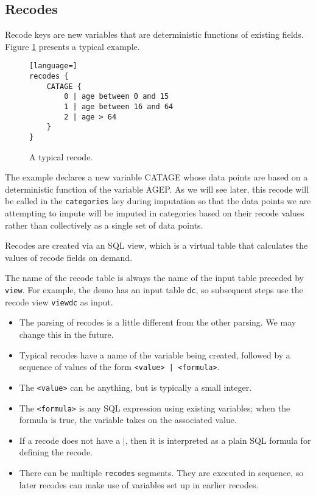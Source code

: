 \documentclass{article}
\begin{document}
\subsection{Recodes}
Recode keys are new variables that are deterministic functions of 
existing fields. Figure \ref{basicrecode} presents a typical example.

\begin{figure}
\begin{lstlisting}[language=]
recodes {
    CATAGE {
        0 | age between 0 and 15
        1 | age between 16 and 64
        2 | age > 64
    }
}
\end{lstlisting}
\caption{A typical recode.}\label{basicrecode}
\end{figure}

The example declares a new variable CATAGE whose data points are based on a
deterministic function of the variable AGEP. As we will see later, this recode will
be called in the {\tt categories} key during imputation so that the data points we
are attempting to impute will be imputed in categories based on their recode values
rather than collectively as a single set of data points.

Recodes are created via an SQL view, which is a virtual table that calculates the
values of recode fields on demand.

The name of the recode table is always the name of the input table preceded by {\tt
view}.  For example, the demo has an input table {\tt dc}, so subsequent steps use
the recode view {\tt viewdc} as input.

\begin{itemize}
\item The parsing of recodes is a little different from the other parsing. We may change
this in the future. 
\item Typical recodes have a name of the variable being created, followed by a sequence of
values of the form {\tt <value> | <formula>}.
\item The {\tt <value>} can be anything, but is typically a small integer.
\item The {\tt <formula>} is any SQL expression using existing variables; when the formula
is true, the variable takes on the associated value.
\item If a recode does not have a $|$, then it is interpreted as a plain SQL formula for
defining the recode.
\item There can be multiple {\tt recodes} segments. They are executed in sequence, so
later recodes can make use of variables set up in earlier recodes.

\end{itemize}
\end{document}
